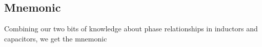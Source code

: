 \documentclass{tufte-handout}
\begin{document}
\noindent{}

\subsection{Mnemonic}

Combining our two bits of knowledge about phase relationships in inductors and capacitors, we get the mnemonic

\noindent{}
\end{document}
